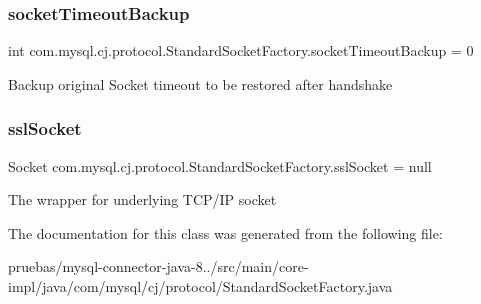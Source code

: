 \subsubsection{\texorpdfstring{socket\+Timeout\+Backup}{socketTimeoutBackup}}
{\footnotesize\ttfamily int com.\+mysql.\+cj.\+protocol.\+Standard\+Socket\+Factory.\+socket\+Timeout\+Backup = 0\hspace{0.3cm}{\ttfamily [protected]}}

Backup original Socket timeout to be restored after handshake \mbox{\label{classcom_1_1mysql_1_1cj_1_1protocol_1_1_standard_socket_factory_aece3a18276dc380df45049ac5d58f731}} 
\subsubsection{\texorpdfstring{ssl\+Socket}{sslSocket}}
{\footnotesize\ttfamily Socket com.\+mysql.\+cj.\+protocol.\+Standard\+Socket\+Factory.\+ssl\+Socket = null\hspace{0.3cm}{\ttfamily [protected]}}

The wrapper for underlying T\+C\+P/\+IP socket 

The documentation for this class was generated from the following file\+:\begin{DoxyCompactItemize}
\item 
pruebas/mysql-\/connector-\/java-\/8../src/main/core-\/impl/java/com/mysql/cj/protocol/Standard\+Socket\+Factory.\+java\end{DoxyCompactItemize}
